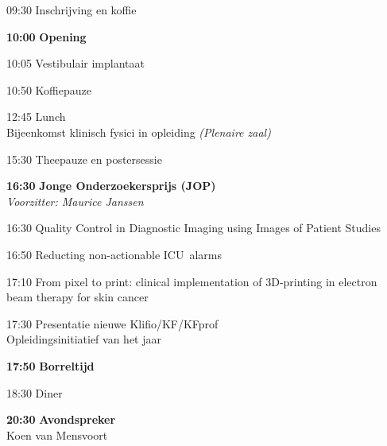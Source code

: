 \documentclass[a4paper,10pt]{report}
\begin{document}
\begin{multicols*}{3}

\newenvironment{packed_enum}{%
    \begin{enumerate}
    \setlength{\itemsep}{1pt}
    \setlength{\itemindent}{0pt}
    \setlength{\parskip}{0pt}
    \setlength{\parsep}{0pt}
    \setlength{\leftmargin}{0pt}
}{\end{enumerate}} %


\begin{packed_enum}
    \item[09:30] Inschrijving en koffie
        \vfill
    \item[\textbf{10:00}] \textbf{Opening}
        \vfill
    \item[10:05] Vestibulair implantaat
        \vfill
    \item[10:50] Koffiepauze
        \vfill
    \item[{\color{Blue}{\textbf{11:20}} }] { }
        \vfill
    \item[12:45] Lunch\\
        {\small Bijeenkomst klinisch fysici in opleiding \hfill\textit{(Plenaire zaal)}}\\
        \vfill
    \item[{\color{Blue}{\textbf{14:00} }}] { }
        \vfill
    \item[15:30] Theepauze en postersessie 
        \vfill
    \item[\textbf{16:30}] {\textbf{Jonge Onderzoekersprijs (JOP)}}\\\textit{Voorzitter: Maurice Janssen}
    \item[16:30] Quality Control in Diagnostic Imaging using Images of Patient Studies
    \item[16:50] Reducting non-actionable ICU alarms
    \item[17:10] From pixel to print: clinical implementation of 3D-printing in electron beam therapy for skin cancer
        \vfill
    \item[17:30] Presentatie nieuwe Klifio/KF/KFprof\\Opleidingsinitiatief van het jaar
        \vfill
    \item[\textbf{17:50}] {\textbf{Borreltijd}}
        \vfill
    \item[18:30] Diner
        \vfill
    \item[\textbf{20:30}] {\textbf{Avondspreker}}\\Koen van Mensvoort
    \end{packed_enum}%


\end{multicols*}
\end{document}
